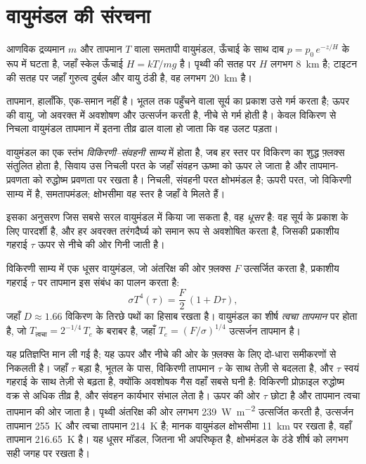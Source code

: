\section{वायुमंडल की संरचना}\label{sec:b3:planetary-atmospheres:structure}

आणविक द्रव्यमान $m$ और तापमान $T$ वाला समतापी वायुमंडल, ऊँचाई के साथ दाब
$p = p_0\,e^{-z/H}$ के रूप में घटता है, जहाँ स्केल ऊँचाई $H = kT/mg$ है।
पृथ्वी की सतह पर $H$ लगभग \qty{8}{km} है; टाइटन की सतह पर
जहाँ गुरुत्व दुर्बल और वायु ठंडी है, वह लगभग \qty{20}{km} है।

तापमान, हालाँकि, एक-समान नहीं है। भूतल तक पहुँचने वाला सूर्य का प्रकाश
उसे गर्म करता है; ऊपर की वायु, जो अवरक्त में अवशोषण और उत्सर्जन करती है,
नीचे से गर्म होती है। केवल विकिरण से निचला वायुमंडल
तापमान में इतना तीव्र ढाल वाला हो जाता कि वह उलट पड़ता।

\begin{definition}[विकिरणी--संवहनी साम्य]\label{def:b3:planetary-atmospheres:rce}
वायुमंडल का एक स्तंभ \emph{विकिरणी--संवहनी
साम्य} में होता है, जब हर स्तर पर
विकिरण का शुद्ध फ़्लक्स संतुलित होता है, सिवाय उस निचली परत के
जहाँ संवहन ऊष्मा को ऊपर ले जाता है और तापमान-प्रवणता को
रुद्धोष्म प्रवणता पर रखता है। निचली, संवहनी परत क्षोभमंडल है; ऊपरी
परत, जो विकिरणी साम्य में है, समतापमंडल; क्षोभसीमा
वह स्तर है जहाँ वे मिलते हैं।
\end{definition}

इसका अनुसरण जिस सबसे सरल वायुमंडल में किया जा सकता है, वह \emph{धूसर} है: वह
सूर्य के प्रकाश के लिए पारदर्शी है, और हर अवरक्त तरंगदैर्घ्य को समान रूप से अवशोषित करता है,
जिसकी प्रकाशीय गहराई $\tau$ ऊपर से नीचे की ओर गिनी जाती है।

\begin{proposition}[धूसर विकिरणी साम्य]\label{prop:b3:planetary-atmospheres:grey}
विकिरणी साम्य में एक धूसर वायुमंडल, जो अंतरिक्ष की ओर फ़्लक्स $F$ उत्सर्जित करता है,
प्रकाशीय गहराई $\tau$ पर तापमान इस संबंध का पालन करता है:
\[
\sigma T^4(\tau) = \frac F2\,(1 + D\tau),
\]
जहाँ $D \approx 1.66$ विकिरण के तिरछे पथों का हिसाब रखता है।
वायुमंडल का शीर्ष \emph{त्वचा तापमान} पर होता है,
जो $T_\text{त्वचा} = 2^{-1/4}\,T_e$ के बराबर है, जहाँ $T_e = (F/\sigma)^{1/4}$
उत्सर्जन तापमान है।
\end{proposition}

यह प्रतिज्ञप्ति मान ली गई है; यह ऊपर और नीचे की ओर के फ़्लक्स के लिए
दो-धारा समीकरणों से निकलती है। जहाँ $\tau$ बड़ा है, भूतल के पास,
विकिरणी तापमान $\tau$ के साथ तेज़ी से बदलता है, और $\tau$ स्वयं
गहराई के साथ तेज़ी से बढ़ता है, क्योंकि अवशोषक गैस वहाँ सबसे घनी है:
विकिरणी प्रोफ़ाइल रुद्धोष्म वक्र से अधिक तीव्र है, और संवहन कार्यभार संभाल लेता है।
ऊपर की ओर $\tau$ छोटा है और तापमान त्वचा तापमान की ओर जाता है। पृथ्वी
अंतरिक्ष की ओर लगभग \qty{239}{W.m^{-2}} उत्सर्जित करती है, उत्सर्जन तापमान
\qty{255}{K} और त्वचा तापमान \qty{214}{K} है; मानक वायुमंडल क्षोभसीमा
\qty{11}{km} पर रखता है, वहाँ तापमान
\qty{216.65}{K} है। यह धूसर मॉडल, जितना भी अपरिष्कृत है,
क्षोभमंडल के ठंडे शीर्ष को लगभग सही जगह पर रखता है।

